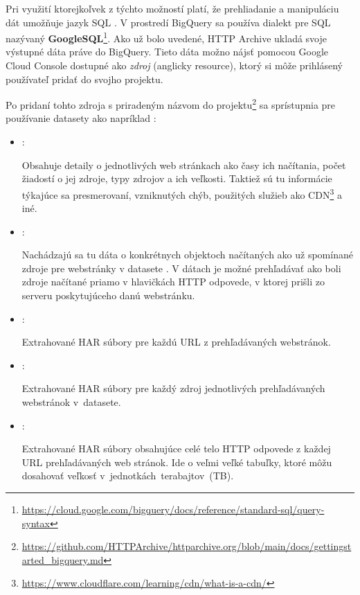 Pri využití ktorejkoľvek z týchto možností platí, že prehliadanie a manipuláciu dát umožňuje jazyk SQL \cite{google-bq}.
V prostredí BigQuery sa používa dialekt pre SQL nazývaný \textbf{GoogleSQL}\footnote{\url{https://cloud.google.com/bigquery/docs/reference/standard-sql/query-syntax}}.
Ako už bolo uvedené, HTTP Archive ukladá svoje výstupné dáta práve do BigQuery.
Tieto dáta možno nájsť pomocou Google Cloud Console dostupné ako \textit{zdroj} (anglicky resource), ktorý si môže prihlásený používateľ pridať do svojho projektu.

\pagebreak

\noindent Po pridaní tohto zdroja s priradeným názvom  do projektu\footnote{\url{https://github.com/HTTPArchive/httparchive.org/blob/main/docs/gettingstarted\_bigquery.md}} sa sprístupnia pre používanie datasety ako napríklad \cite{httparchive-repo}:

\begin{itemize}
    \item {}:

    Obsahuje detaily o jednotlivých web stránkach ako časy ich načítania, počet žiadostí o jej zdroje, typy zdrojov a ich veľkosti.
    Taktiež sú tu informácie týkajúce sa presmerovaní, vzniknutých chýb, použitých služieb ako CDN\footnote{\url{https://www.cloudflare.com/learning/cdn/what-is-a-cdn/}} a iné.
    
    \item {}:

    Nachádzajú sa tu dáta o konkrétnych objektoch načítaných ako už spomínané zdroje pre webstránky v datasete .
    V dátach je možné prehľadávať ako boli zdroje načítané priamo v hlavičkách HTTP odpovede, v ktorej prišli zo serveru poskytujúceho danú webstránku.
    
    \item {}:

    Extrahované HAR súbory pre každú URL z prehľadávaných webstránok.
    
    \item {}:

    Extrahované HAR súbory pre každý zdroj jednotlivých prehľadávaných webstránok \mbox{v  datasete}.
    
    \item {}:

    Extrahované HAR súbory obsahujúce celé telo HTTP odpovede z každej URL prehľadávaných web stránok.
    Ide o veľmi veľké tabuľky, ktoré môžu dosahovať veľkosť \mbox{v jednotkách terabajtov (TB)}.
\end{itemize}

